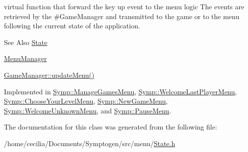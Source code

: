 virtual function that forward the key up event to the menu logic The events are retrieved by the \#\-Game\-Manager and transmitted to the game or to the menu following the current state of the application. 

\begin{DoxySeeAlso}{See Also}
\hyperlink{class_symp_1_1_state}{State} 

\hyperlink{class_symp_1_1_menu_manager}{Menu\-Manager} 

\hyperlink{class_symp_1_1_game_manager_a53eae391ee3ea958e26d60b51516c770}{Game\-Manager\-::update\-Menu()} 
\end{DoxySeeAlso}


Implemented in \hyperlink{class_symp_1_1_manage_games_menu_a31141c164d9d36c51eb1a0b5803f0974}{Symp\-::\-Manage\-Games\-Menu}, \hyperlink{class_symp_1_1_welcome_last_player_menu_ab277e548cec10d96524643b117831a52}{Symp\-::\-Welcome\-Last\-Player\-Menu}, \hyperlink{class_symp_1_1_choose_your_level_menu_a59974b0d10b806ed646569b4b658d68f}{Symp\-::\-Choose\-Your\-Level\-Menu}, \hyperlink{class_symp_1_1_new_game_menu_abb3d59240c9874026dd996bc9fb9a290}{Symp\-::\-New\-Game\-Menu}, \hyperlink{class_symp_1_1_welcome_unknown_menu_a2fcfb802e8398d1a5178b904841650fb}{Symp\-::\-Welcome\-Unknown\-Menu}, and \hyperlink{class_symp_1_1_pause_menu_ab6329d721b22dfb991e794768e0d5afd}{Symp\-::\-Pause\-Menu}.



The documentation for this class was generated from the following file\-:\begin{DoxyCompactItemize}
\item 
/home/cecilia/\-Documents/\-Symptogen/src/menu/\hyperlink{_state_8h}{State.\-h}\end{DoxyCompactItemize}
